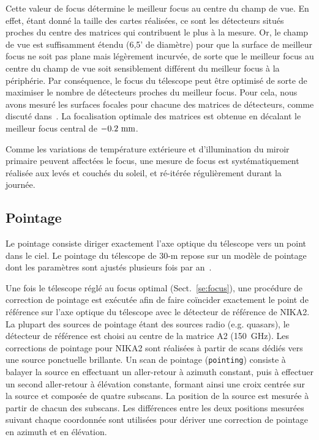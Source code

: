 Cette valeur de focus détermine le meilleur focus au centre du champ
de vue. En effet, étant donné la taille des cartes réalisées, ce sont
les détecteurs situés proches du centre des matrices qui contribuent le
plus à la mesure. Or, le champ de vue est suffisamment étendu (6,5' de
diamètre) pour que la surface de meilleur focus ne soit pas plane mais
légèrement incurvée, de sorte que le meilleur focus au centre du champ
de vue soit sensiblement différent du meilleur focus à la
périphérie. Par conséquence, le focus du télescope peut être optimisé
de sorte de maximiser le nombre de détecteurs proches du meilleur
focus. Pour cela, nous avons mesuré les surfaces focales pour chacune
des matrices de détecteurs, comme discuté dans~\citet{Perotto2019}. La
focalisation optimale des matrices est obtenue en décalant le meilleur
focus central de $-0.2~\rm{mm}$.

Comme les variations de température extérieure et d'illumination du
miroir primaire peuvent affectées le focus, une mesure de focus est
systématiquement réalisée aux levés et couchés du soleil, et ré-itérée
régulièrement durant la journée. 

\subsection{Pointage}
\label{se:pointing}

Le pointage consiste diriger exactement l'axe optique du
télescope vers un point dans le ciel. Le pointage du télescope de 30-m
repose sur un modèle de pointage dont les paramètres sont ajustés
plusieurs fois par an~\citep{Greve1996}. 

Une fois le télescope réglé au focus optimal (Sect.~\ref{se:focus}),
une procédure de correction de pointage est exécutée afin de faire
coïncider exactement le point de référence sur l'axe optique du
télescope avec le détecteur de référence de NIKA2. La plupart des
sources de pointage étant des sources radio (e.g. quasars), le
détecteur de référence est choisi au centre de la matrice A2
(150~GHz). Les corrections de pointage pour NIKA2 sont réalisées à
partir de scans dédiés vers une
source ponctuelle brillante. Un scan de pointage ({\tt pointing})
consiste à balayer la source en effectuant un aller-retour à azimuth
constant, puis à effectuer un second aller-retour à élévation
constante, formant ainsi une croix centrée sur la source et composée
de quatre subscans. La position de la source est mesurée à partir de
chacun des subscans. Les différences entre les deux positions mesurées
suivant chaque coordonnée sont utilisées pour dériver une
correction de pointage en azimuth et en élévation. 
 

